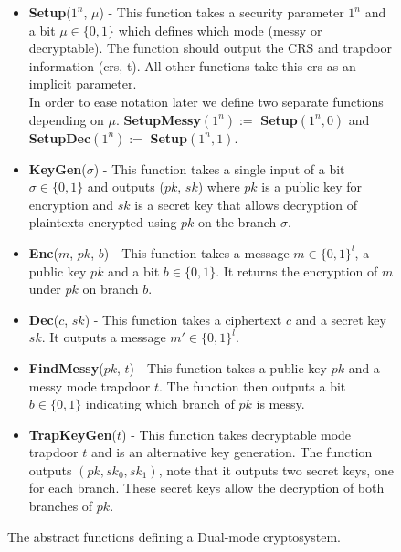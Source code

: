 \documentclass[ %
                    author={Nicholas Tutte},
                supervisor={Prof. Nigel Smart},
                    degree={MEng},
                     title={Secure Two Party Computation},
                  subtitle={A practical comparison of recent protocols},
                      type={Research - GG1K},
                      year={2015} ]{dissertation}
\begin{document}
					\begin{figure}[!htb]
						\begin{mdframed}
							\centering
							\begin{itemize}
								\item \textbf{Setup}($1^n$, $\mu$) - This function takes a security parameter $1^n$ and a bit $\mu \in \{0, 1\}$ which defines which mode (messy or decryptable). The function should output the CRS and trapdoor information (crs, t). All other functions take this crs as an implicit parameter.\\[0.25cm]

								In order to ease notation later we define two separate functions depending on $\mu$. \textbf{SetupMessy}$(1^n) :=$ \textbf{Setup}$(1^n, 0)$ and \textbf{SetupDec}$(1^n) :=$ \textbf{Setup}$(1^n, 1)$.\\[0.25cm]


								\item \textbf{KeyGen}($\sigma$) - This function takes a single input of a bit $\sigma \in \{0, 1\}$ and outputs ($pk$, $sk$) where $pk$ is a public key for encryption and $sk$ is a secret key that allows decryption of plaintexts encrypted using $pk$ on the branch $\sigma$.

								\item \textbf{Enc}($m$, $pk$, $b$) - This function takes a message $m \in \{0, 1\}^l$, a public key $pk$ and a bit $b \in \{0, 1\}$. It returns the encryption of $m$ under $pk$ on branch $b$.

								\item \textbf{Dec}($c$, $sk$) - This function takes a ciphertext $c$ and a secret key $sk$. It outputs a message $m' \in \{0, 1\}^l$.

								\item \textbf{FindMessy}($pk$, $t$) - This function takes a public key $pk$ and a messy mode trapdoor $t$. The function then outputs a bit $b \in \{0, 1\}$ indicating which branch of $pk$ is messy.

								\item \textbf{TrapKeyGen}($t$) - This function takes decryptable mode trapdoor $t$ and is an alternative key generation. The function outputs $(pk, sk_0, sk_1)$, note that it outputs two secret keys, one for each branch. These secret keys allow the decryption of both branches of $pk$.
							\end{itemize}
						\end{mdframed}

						\caption{The abstract functions defining a Dual-mode cryptosystem. \label{fig:PVW_Abstract_Functions}}
					\end{figure}
\end{document}
